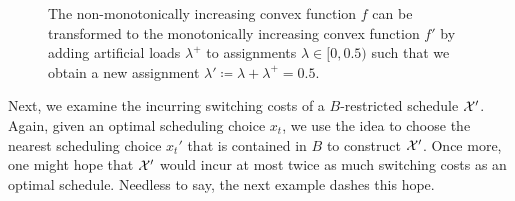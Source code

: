 \begin{figure}[H]
\captionsetup[subfigure]{labelformat=empty}
\begin{subfigure}[b]{0.5\textwidth}

\end{subfigure}
\hfill
\begin{subfigure}[b]{0.5\textwidth}

\end{subfigure}
\caption{The non-monotonically increasing convex function $f$ can be transformed to the monotonically increasing convex function $f'$ by adding artificial loads $\lambda^+$ to assignments $\lambda\in[0,0.5)$ such that we obtain a new assignment $\lambda'\coloneqq\lambda+\lambda^+=0.5$.}
\label{fig:transform_to_mono_incr}
\end{figure}
Next, we examine the incurring switching costs of a $B$-restricted schedule $\mathcal{X}'$. Again, given an optimal scheduling choice $x_t$, we use the idea to choose the nearest scheduling choice $x_t'$ that is contained in $B$ to construct $\mathcal{X}'$. Once more, one might hope that $\mathcal{X}'$ would incur at most twice as much switching costs as an optimal schedule. Needless to say, the next example dashes this hope.
